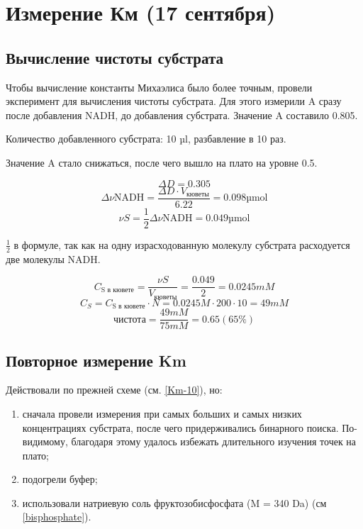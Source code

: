 \section{Измерение Км (17 сентября)}

\subsection{Вычисление чистоты субстрата}
Чтобы вычисление константы Михаэлиса было более точным, провели
эксперимент для вычисления чистоты субстрата.
Для этого измерили A сразу после добавления NADH, до добавления субстрата.
Значение A составило 0.805.

Количество добавленного субстрата: 10 µl, разбавление в 10 раз.

Значение A стало снижаться, после чего вышло на плато на уровне 0.5.

$$ \Delta D = 0.305 $$
$$ \Delta \nu\text{NADH} = \frac{\Delta D \cdot V_\text{кюветы}}{6.22} = 0.098 \text{µmol} $$
$$ \nu S = \frac{1}{2} \Delta \nu\text{NADH} = 0.049 \text{µmol} $$

$\frac{1}{2}$ в формуле, так как на одну израсходованную молекулу субстрата
расходуется две молекулы NADH.

$$ C_\text{S в кювете} = \frac{\nu S}{V_\text{кюветы}} = \frac{0.049}{2} = 0.0245 mM $$
$$ C_S = C_\text{S в кювете} \cdot N = 0.0245 M \cdot 200 \cdot 10 = 49 mM $$
$$ \text{чистота} = \frac{49 mM}{75 mM} = 0.65 (65 \%) $$

\subsection{Повторное измерение Km}
Действовали по прежней схеме (см. \ref{Km-10}), но:
\begin{enumerate}
\item сначала провели измерения при самых больших и самых низких концентрациях субстрата,
    после чего придерживались бинарного поиска.
    По-видимому, благодаря этому удалось избежать длительного изучения точек на плато;
\item подогрели буфер;
\item использовали натриевую соль фруктозобисфосфата (M = 340 Da) (см \ref{bisphosphate}).
\end{enumerate}

